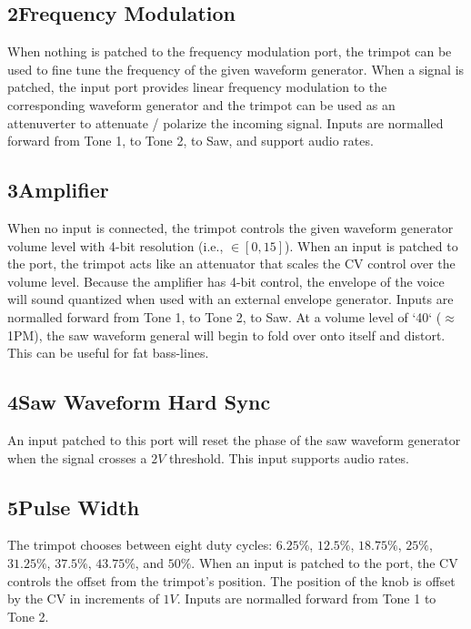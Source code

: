 \documentclass[12pt,letter]{article}
\begin{document}
\subsection*{2{\quad}Frequency Modulation}

When nothing is patched to the frequency modulation port, the trimpot can be used to fine tune the frequency of the given waveform generator. When a signal is patched, the input port provides linear frequency modulation to the corresponding waveform generator and the trimpot can be used as an attenuverter to attenuate / polarize the incoming signal. Inputs are normalled forward from Tone 1, to Tone 2, to Saw, and support audio rates.

\subsection*{3{\quad}Amplifier}

When no input is connected, the trimpot controls the given waveform generator volume level with 4-bit resolution (i.e., $\in [0, 15]$). When an input is patched to the port, the trimpot acts like an attenuator that scales the CV control over the volume level. Because the amplifier has 4-bit control, the envelope of the voice will sound quantized when used with an external envelope generator. Inputs are normalled forward from Tone 1, to Tone 2, to Saw. At a volume level of `40` ($\approx$ 1PM), the saw waveform general will begin to fold over onto itself and distort. This can be useful for fat bass-lines.

\subsection*{4{\quad}Saw Waveform Hard Sync}

An input patched to this port will reset the phase of the saw waveform generator when the signal crosses a $2V$ threshold. This input supports audio rates.

\subsection*{5{\quad}Pulse Width}

The trimpot chooses between eight duty cycles: $6.25\%$, $12.5\%$, $18.75\%$, $25\%$, $31.25\%$, $37.5\%$, $43.75\%$, and $50\%$. When an input is patched to the port, the CV controls the offset from the trimpot's position. The position of the knob is offset by the CV in increments of $1V$. Inputs are normalled forward from Tone 1 to Tone 2.
\end{document}
